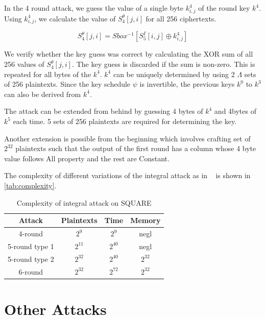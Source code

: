 \documentclass[preprint]{transcrypto}
\begin{document}
In the 4 round attack, we guess the value of a single byte $k_{i,j}^4$ of the round key $k^4$. Using $k_{i,j}^4$, we calculate the value of $S_4^\theta[j,i]$ for all 256 ciphertexts.

\begin{equation*}
  S_4^\theta[j,i] = Sbox^{-1}[S_5^I[i,j] \oplus k_{i,j}^4]
\end{equation*}

We verify whether the key guess was correct by calculating the XOR sum of all 256 values of $S_4^\theta[j,i]$. The key guess is discarded if the sum is non-zero. This is repeated for all bytes of the $k^4$. $k^4$ can be uniquely determined by using 2 $\Lambda$ sets of 256 plaintexts. Since the key schedule $\psi$ is invertible, the previous keys $k^0$ to $k^3$ can also be derived from $k^4$.

The attack can be extended from behind by guessing 4 bytes of $k^4$ and 4bytes of $k^5$ each time. 5 sets of 256 plaintexts are required for determining the key.

Another extension is possible from the beginning which involves crafting set of $2^32$ plaintexts such that the output of the first round has a column whose 4 byte value follows All property and the rest are Constant.

The complexity of different variations of the integral attack as in ~\cite{FSE:DaeKnuRij97} is shown in \autoref{tab:complexity}.

\begin{table}
  \centering
  \begin{tabular}{|c|c|c|c|}
    \hline
    Attack          & Plaintexts & Time     & Memory   \\
    \hline
    4-round         & $2^9$      & $2^9$    & negl     \\
    5-round  type 1 & $2^{11}$   & $2^{40}$ & negl     \\
    5-round  type 2 & $2^{32}$   & $2^{40}$ & $2^{32}$ \\
    6-round         & $2^{32}$   & $2^{72}$ & $2^{32}$ \\
    \hline
  \end{tabular}

  \caption{Complexity of integral attack on SQUARE}
  \label{tab:complexity}
\end{table}

\section{Other Attacks}
\end{document}
